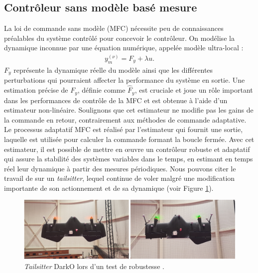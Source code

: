 \subsection*{Contrôleur sans modèle basé mesure}

La loi de commande sans modèle (MFC) \cite{Safonov, Stefanovic, Fliess_2013}  nécessite peu de connaissances préalables du système contrôlé pour concevoir le contrôleur.
On modélise la dynamique inconnue par une équation numérique, appelée modèle ultra-local :
\begin{align}
    y_{m}^{(\nu)} = F_{y} + \lambda u.
\end{align}
$F_{y}$ représente la dynamique réelle du modèle ainsi que les différentes perturbations qui pourraient affecter la performance du système en sortie. Une estimation précise de $F_{y}$, définie comme $\hat{F}_{y}$, est cruciale et joue un rôle important dans les performances de contrôle de la MFC et est obtenue à l'aide d'un estimateur non-linéaire. Soulignons que cet estimateur ne modifie pas les gains de la commande en retour, contrairement aux méthodes de commande adaptative. Le processus adaptatif MFC est réalisé par l'estimateur qui fournit une sortie, laquelle est utilisée pour calculer la commande formant la boucle fermée. Avec cet estimateur, il est possible de mettre en œuvre un contrôleur robuste et adaptatif qui assure la stabilité des systèmes variables dans le temps, en estimant en temps réel leur dynamique à partir des mesures périodiques. Nous pouvons citer le travail de \cite{olszaneckibarthHal-02542982} sur un \textit{tailsitter}, lequel continue de voler malgré une modification importante de son actionnement et de sa dynamique (voir Figure \ref{fig:darko_mfc}).

\begin{figure}[ht!]
    \centerline{
    \includegraphics[trim=0cm 0cm 0cm 0cm,clip,width=0.7\columnwidth]{figures/darko_MFC.png}}
    \caption{\textit{Tailsitter} DarkO lors d'un test de robustesse \cite{olszaneckibarthHal-02542982}.}
    \label{fig:darko_mfc}
\end{figure}



